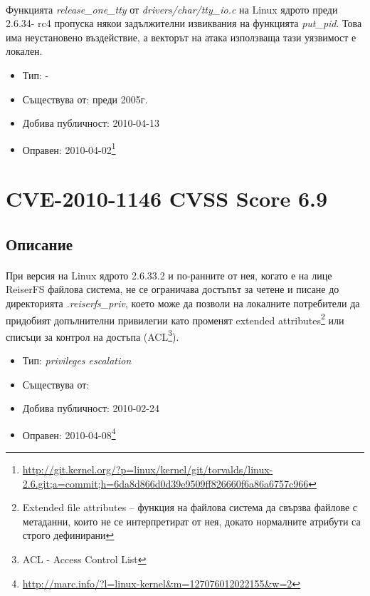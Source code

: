 \documentclass[a4paper,12pt,leqno]{article}
\begin{document}
\paragraph{}
Функцията \textit{release\_one\_tty} от \textit{drivers/char/tty\_io.c} на Linux ядрото преди 2.6.34-
rc4 пропуска някои задължителни извиквания на функцията \textit{put\_pid}. Това има 
неустановено въздействие, а векторът на атака използваща тази уязвимост е 
локален.

\begin{itemize}
    \item Тип: -
    \item Съществува от: преди 2005г.
  	\item Добива публичност: 2010-04-13
    \item Оправен: 2010-04-02\footnote{\url{http://git.kernel.org/?p=linux/kernel/git/torvalds/linux-2.6.git;a=commit;h=6da8d866d0d39e9509ff826660f6a86a6757c966}}
\end{itemize}

\section{CVE-2010-1146 CVSS Score 6.9}
\subsection{Описание}
\paragraph{}
При версия на Linux ядрото 2.6.33.2 и по-ранните от нея, когато е на лице 
ReiserFS файлова система, не се ограничава достъпът за четене и писане до 
директорията \textit{.reiserfs\_priv}, което може да позволи на локалните потребители 
да придобият допълнителни привилегии като променят extended attributes\footnote{Extended file attributes – функция на файлова система да свързва файлове с метаданни, които 
не се интерпретират от нея, докато нормалните атрибути са строго дефинирани}
или списъци за контрол на достъпа (ACL\footnote{ACL - Access Control List}).


\begin{itemize}
    \item Тип: \textit{privileges escalation}
    \item Съществува от:
  	\item Добива публичност: 2010-02-24
    \item Оправен: 2010-04-08\footnote{\url{http://marc.info/?l=linux-kernel&m=127076012022155&w=2}}
\end{itemize}
\end{document}
